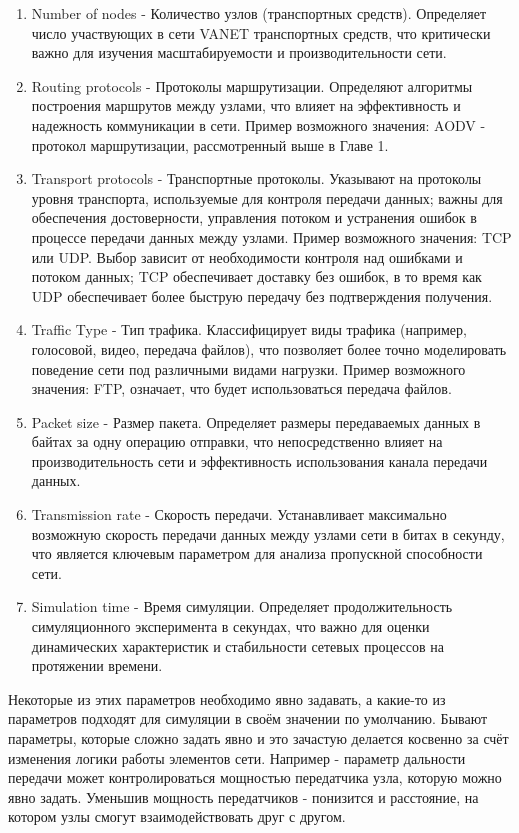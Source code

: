 \begin{enumerate}
  \item Number of nodes - Количество узлов (транспортных средств). Определяет число участвующих в сети VANET транспортных средств, что критически важно для изучения масштабируемости и производительности сети.
  \item Routing protocols - Протоколы маршрутизации. Определяют алгоритмы построения маршрутов между узлами, что влияет на эффективность и надежность коммуникации в сети. Пример возможного значения: AODV - протокол маршрутизации, рассмотренный выше в Главе 1.
  \item Transport protocols - Транспортные протоколы. Указывают на протоколы уровня транспорта, используемые для контроля передачи данных; важны для обеспечения достоверности, управления потоком и устранения ошибок в процессе передачи данных между узлами. Пример возможного значения: TCP или UDP. Выбор зависит от необходимости контроля над ошибками и потоком данных; TCP обеспечивает доставку без ошибок, в то время как UDP обеспечивает более быструю передачу без подтверждения получения.
  \item Traffic Type - Тип трафика. Классифицирует виды трафика (например, голосовой, видео, передача файлов), что позволяет более точно моделировать поведение сети под различными видами нагрузки. Пример возможного значения: FTP, означает, что будет использоваться передача файлов.
  \item Packet size - Размер пакета. Определяет размеры передаваемых данных в байтах за одну операцию отправки, что непосредственно влияет на производительность сети и эффективность использования канала передачи данных.
  \item Transmission rate - Скорость передачи. Устанавливает максимально возможную скорость передачи данных между узлами сети в битах в секунду, что является ключевым параметром для анализа пропускной способности сети.
  \item Simulation time - Время симуляции. Определяет продолжительность симуляционного эксперимента в секундах, что важно для оценки динамических характеристик и стабильности сетевых процессов на протяжении времени.
\end{enumerate}

Некоторые из этих параметров необходимо явно задавать, а какие-то из параметров подходят для симуляции в своём значении по умолчанию. Бывают параметры, которые сложно задать явно и это зачастую делается косвенно за счёт изменения логики работы элементов сети. Например - параметр дальности передачи может контролироваться мощностью передатчика узла, которую можно явно задать. Уменьшив мощность передатчиков - понизится и расстояние, на котором узлы смогут взаимодействовать друг с другом.

